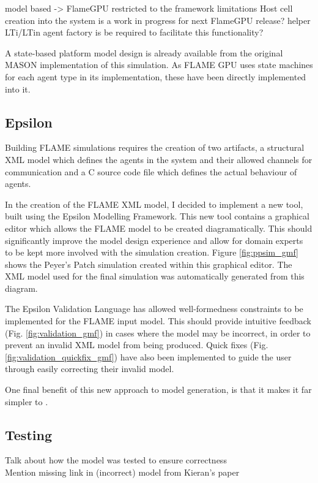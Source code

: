 \documentclass{UoYCSproject}
\begin{document}
model based -> FlameGPU\cite{flame_keratinocyte}
	restricted to the framework limitations
		Host cell creation into the system is a work in progress for next FlameGPU release?
			helper LTi/LTin agent factory is be required to facilitate this functionality?


	A state-based platform model design is already available from the original MASON implementation of this simulation.
	As FLAME GPU uses state machines for each agent type in its implementation, these have been directly implemented into it.

\subsection{Epsilon}
Building FLAME simulations requires the creation of two artifacts, a structural XML model which defines the agents in the system and their allowed channels for communication and a C source code file which defines the actual behaviour of agents.

In the creation of the FLAME XML model, I decided to implement a new tool, built using the Epsilon Modelling Framework.
This new tool contains a graphical editor which allows the FLAME model to be created diagramatically.
This should significantly improve the model design experience and allow for domain experts to be kept more involved with the simulation creation.
Figure \ref{fig:ppsim_gmf} shows the Peyer's Patch simulation created within this graphical editor. The XML model used for the final simulation was automatically generated from this diagram.

The Epsilon Validation Language has allowed well-formedness constraints to be implemented for the FLAME input model.
This should provide intuitive feedback (Fig. \ref{fig:validation_gmf}) in cases where the model may be incorrect, in order to prevent an invalid XML model from being produced.
Quick fixes (Fig. \ref{fig:validation_quickfix_gmf}) have also been implemented to guide the user through easily correcting their invalid model.

One final benefit of this new approach to model generation, is that it makes it far simpler to .

\subsection{Testing}
Talk about how the model was tested to ensure correctness\\
Mention missing link in (incorrect) model from Kieran's paper 
\end{document}

